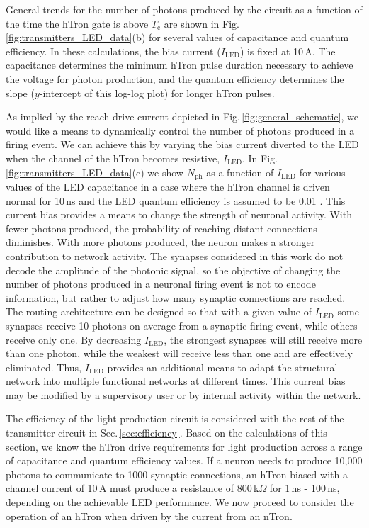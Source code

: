 \documentclass[aip,amsmath,amssymb,reprint,nofootinbib]{revtex4-1}
\begin{document}
General trends for the number of photons produced by the circuit as a function of the time the hTron gate is above $T_{\mathrm{c}}$ are shown in Fig.\,\ref{fig:transmitters_LED_data}(b) for several values of capacitance and quantum efficiency. In these calculations, the bias current ($I_{\mathrm{LED}}$) is fixed at 10\,\textmu A. The capacitance determines the minimum hTron pulse duration necessary to achieve the voltage for photon production, and the quantum efficiency determines the slope ($y$-intercept of this log-log plot) for longer hTron pulses.

As implied by the reach drive current depicted in Fig.\,\ref{fig:general_schematic}, we would like a means to dynamically control the number of photons produced in a firing event. We can achieve this by varying the bias current diverted to the LED when the channel of the hTron becomes resistive, $I_{\mathrm{LED}}$. In Fig.\,\ref{fig:transmitters_LED_data}(c) we show $N_{\mathrm{ph}}$ as a function of $I_{\mathrm{LED}}$ for various values of the LED capacitance in a case where the hTron channel is driven normal for 10\,ns and the LED quantum efficiency is assumed to be 0.01 \cite{doro2017}. This current bias provides a means to change the strength of neuronal activity. With fewer photons produced, the probability of reaching distant connections diminishes. With more photons produced, the neuron makes a stronger contribution to network activity. The synapses considered in this work do not decode the amplitude of the photonic signal, so the objective of changing the number of photons produced in a neuronal firing event is not to encode information, but rather to adjust how many synaptic connections are reached. The routing architecture can be designed so that with a given value of $I_{\mathrm{LED}}$ some synapses receive 10 photons on average from a synaptic firing event, while others receive only one. By decreasing $I_{\mathrm{LED}}$, the strongest synapses will still receive more than one photon, while the weakest will receive less than one and are effectively eliminated. Thus, $I_{\mathrm{LED}}$ provides an additional means to adapt the structural network into multiple functional networks at different times. This current bias may be modified by a supervisory user or by internal activity within the network.

The efficiency of the light-production circuit is considered with the rest of the transmitter circuit in Sec.\,\ref{sec:efficiency}. Based on the calculations of this section, we know the hTron drive requirements for light production across a range of capacitance and quantum efficiency values. If a neuron needs to produce 10,000 photons to communicate to 1000 synaptic connections, an hTron biased with a channel current of 10\,\textmu A must produce a resistance of 800\,k$\Omega$ for 1\,ns - 100\,ns, depending on the achievable LED performance. We now proceed to consider the operation of an hTron when driven by the current from an nTron.  
	
\end{document}
